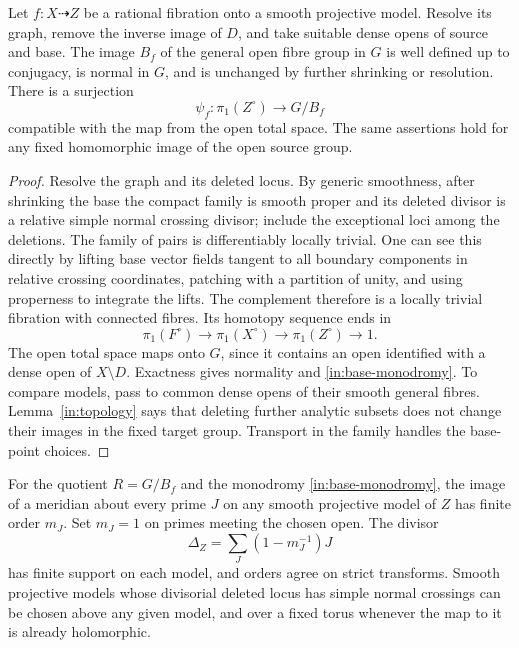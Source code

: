 \begin{lemma}\label{in:open-images}
Let \(f:X\dashrightarrow Z\) be a rational fibration onto a smooth
projective model.  Resolve its graph, remove the inverse image of
\(D\), and take suitable dense opens of source and base.  The image
\(B_f\) of the general open fibre group in \(G\) is well defined up
to conjugacy, is normal in \(G\), and is unchanged by further
shrinking or resolution.  There is a surjection
\begin{equation}\label{in:base-monodromy}
 \psi_f:\pi_1(Z^\circ)\longrightarrow G/B_f
\end{equation}
compatible with the map from the open total space.
The same assertions hold for any fixed homomorphic image of the
open source group.
\end{lemma}

\begin{proof}
Resolve the graph and its deleted locus.  By generic smoothness,
after shrinking the base the compact family is smooth proper and
its deleted divisor is a relative simple normal crossing divisor;
include the exceptional loci among the deletions.  The family of
pairs is differentiably locally trivial.  One can see this directly
by lifting base vector fields tangent to all boundary components
in relative crossing coordinates, patching with a partition of
unity, and using properness to integrate the lifts.  The complement
therefore is a locally trivial fibration with connected fibres.
Its homotopy sequence ends in
\[
 \pi_1(F^\circ)\longrightarrow\pi_1(X^\circ)
       \longrightarrow\pi_1(Z^\circ)\longrightarrow1.
\]
The open total space maps onto \(G\), since it contains an open
identified with a dense open of \(X\setminus D\).  Exactness gives
normality and \eqref{in:base-monodromy}.  To compare models, pass
to common dense opens of their smooth general fibres.
Lemma~\ref{in:topology} says that deleting further analytic subsets
does not change their images in the fixed target group.  Transport
in the family handles the base-point choices.
\end{proof}

\begin{lemma}\label{in:actual-inertia}
For the quotient \(R=G/B_f\) and the monodromy
\eqref{in:base-monodromy}, the image of a meridian about every prime
\(J\) on any smooth projective model of \(Z\) has finite order
\(m_J\).  Set \(m_J=1\) on primes meeting the chosen open.  The divisor
\begin{equation}\label{in:boundary}
 \Delta_Z=\sum_J(1-m_J^{-1})J
\end{equation}
has finite support on each model, and orders agree on strict
transforms.  Smooth projective models whose divisorial deleted
locus has simple normal crossings can be chosen above any given
model, and over a fixed torus whenever the map to it is already
holomorphic.
\end{lemma}

